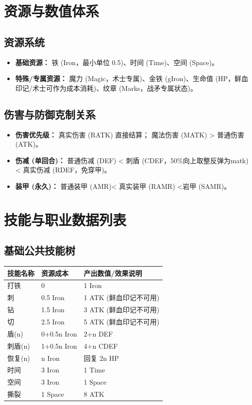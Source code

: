 \documentclass[a4paper,10pt]{ctexart}
\begin{document}
\section{资源与数值体系}

\subsection{资源系统}
\begin{itemize}
    \item \textbf{基础资源：} 铁 (Iron，最小单位 0.5)、时间 (Time)、空间 (Space)。
    \item \textbf{特殊/专属资源：} 魔力 (Magic，术士专属)、金铁 (gIron)、生命值 (HP，鲜血印记/术士可作为成本消耗)、纹章 (Marks，战矛专属状态)。
\end{itemize}

\subsection{伤害与防御克制关系}
\begin{itemize}
    \item \textbf{伤害优先级：} 真实伤害 (RATK) 直接结算； 魔法伤害 (MATK) > 普通伤害 (ATK)。
    \item \textbf{伤减 (单回合)：} 普通伤减 (DEF) < 刺盾 (CDEF，50\%向上取整反弹为matk)< 真实伤减 (RDEF，免穿甲)。
    \item \textbf{装甲 (永久)：} 普通装甲 (AMR)< 真实装甲 (RAMR) <岩甲 (SAMR)。
\end{itemize}

\section{技能与职业数据列表}

\subsection{基础公共技能树}
\begin{table}[h]
\centering
\begin{tabular}{lll}
\toprule
技能名称 & 资源成本 & 产出数值/效果说明 \\
\midrule
打铁 & 0 & 1 Iron \\
刺 & 0.5 Iron & 1 ATK (鲜血印记不可用) \\
钻 & 1.5 Iron & 3 ATK (鲜血印记不可用) \\
切 & 2.5 Iron & 5 ATK (鲜血印记不可用) \\
盾(n) & 0+0.5n Iron & 2+n DEF \\
刺盾(n) & 1+0.5n Iron & 4+n CDEF \\
恢复(n) & n Iron & 回复 2n HP \\
时间 & 3 Iron & 1 Time \\
空间 & 3 Iron & 1 Space \\
撕裂 & 1 Space & 8 ATK \\
\bottomrule
\end{tabular}
\end{table}
\end{document}
